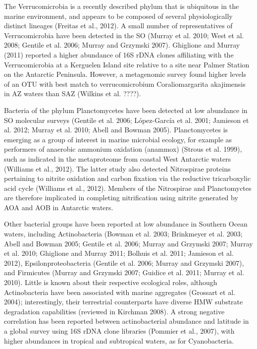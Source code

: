 
The Verrucomicrobia is a recently described phylum that is ubiquitous in the marine environment, and appears to be composed of several physiologically distinct lineages (Freitas et al., 2012). A small number of representatives of Verrucomicrobia have been detected in the SO (Murray et al. 2010; West et al. 2008; Gentile et al. 2006; Murray and Grzymski 2007). Ghiglione and Murray (2011) reported a higher abundance of 16S rDNA clones affiliating with the Verrucomicrobia at a Kerguelen Island site relative to a site near Palmer Station on the Antarctic Peninsula. However, a metagenomic survey found higher levels of an OTU with best match to verrucomicrobium Coraliomargarita akajimensis in AZ waters than SAZ (Wilkins et al. ????). 



Bacteria of the phylum Planctomycetes have been detected at low abundance in SO molecular surveys (Gentile et al. 2006; López-García et al. 2001; Jamieson et al. 2012; Murray et al. 2010; Abell and Bowman 2005). Planctomycetes is emerging as a group of interest in marine microbial ecology, for example as performers of anaerobic ammonium oxidation (anammox) (Strous et al. 1999), such as indicated in the metaproteome from coastal West Antarctic waters (Williams et al., 2012). The latter study also detected Nitrospirae proteins pertaining to nitrite oxidation and carbon fixation via the reductive tricarboxylic acid cycle (Williams et al., 2012). Members of the Nitrospirae and Planctomyctes are therefore implicated in completing nitrification using nitrite generated by AOA and AOB in Antarctic waters.

Other bacterial groups have been reported at low abundance in Southern Ocean waters, including Actinobacteria (Bowman et al. 2003; Brinkmeyer et al. 2003; Abell and Bowman 2005; Gentile et al. 2006; Murray and Grzymski 2007; Murray et al. 2010; Ghiglione and Murray 2011; Bolhuis et al. 2011; Jamieson et al. 2012), Epsilonproteobacteria (Gentile et al. 2006; Murray and Grzymski 2007), and Firmicutes (Murray and Grzymski 2007; Guidice et al. 2011; Murray et al. 2010). Little is known about their respective ecological roles, although Actinobacteria have been associated with marine aggregates (Grossart et al. 2004); interestingly, their terrestrial counterparts have diverse HMW substrate degradation capabilities (reviewed in Kirchman 2008). A strong negative correlation has been reported between actinobacterial abundance and latitude in a global survey using 16S rDNA clone libraries (Pommier et al., 2007), with higher abundances in tropical and subtropical waters, as for Cyanobacteria.

